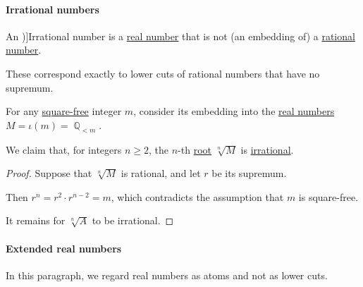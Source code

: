 \paragraph{Irrational numbers}

\begin{definition}\label{def:irrational_number}
  An \term[ru=иррациональное число (\cite[def. II.1]{Александров1977ОбщаяТопология})]{Irrational number} is a \hyperref[def:real_numbers]{real number} that is not (an embedding of) a \hyperref[def:rational_numbers]{rational number}.
\end{definition}
\begin{comments}
  \item These correspond exactly to lower cuts of rational numbers that have no supremum.
\end{comments}

\begin{proposition}\label{thm:real_nth_root_is_irrational}
  For any \hyperref[def:square_free_element]{square-free} integer \( m \), consider its embedding into the \hyperref[def:real_numbers]{real numbers} \( M = \iota(m) = \BbbQ_{<m} \).

  We claim that, for integers \( n \geq 2 \), the \( n \)-th \hyperref[def:principal_nonnegative_nth_root]{root} \( \sqrt[n]{ M } \) is \hyperref[def:irrational_number]{irrational}.
\end{proposition}
\begin{proof}
  Suppose that \( \sqrt[n]{ M } \) is rational, and let \( r \) be its supremum.

  Then \( r^n = r^2 \cdot r^{n-2} = m \), which contradicts the assumption that \( m \) is square-free.

  It remains for \( \sqrt[n]{ A } \) to be irrational.
\end{proof}

\paragraph{Extended real numbers}\hfill

In this paragraph, we regard real numbers as atoms and not as lower cuts.


